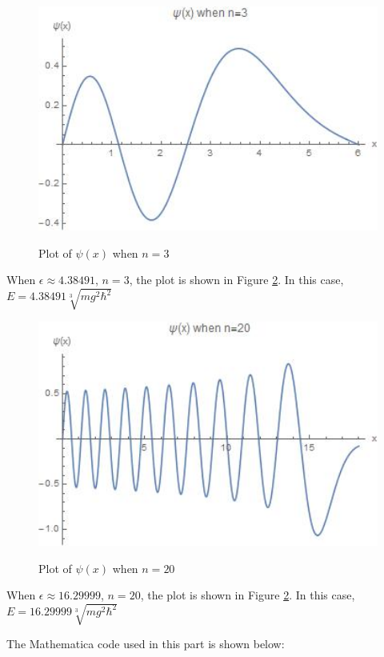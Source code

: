 \documentclass[12pt]{article}
\begin{document}
\begin{spacing}{2.0}
\begin{figure}
  \centering
  \includegraphics[width=5in]{out5}\\
  \caption{Plot of $\psi(x)$ when $n=3$ }\label{out5}
\end{figure}

When $\epsilon \approx 4.38491$, $n=3$, the plot is shown in Figure \ref{out5}. In this case, $E= 4.38491 \sqrt[3]{mg^2 \hbar^2}$

\begin{figure}
  \centering
  \includegraphics[width=5in]{out6}\\
  \caption{Plot of $\psi(x)$ when $n=20$ }\label{out5}
\end{figure}

When $\epsilon \approx 16.29999$, $n=20$, the plot is shown in Figure \ref{out5}. In this case, $E= 16.29999 \sqrt[3]{mg^2 \hbar^2}$

The Mathematica code used in this part is shown below:


\end{spacing}
\end{document}
